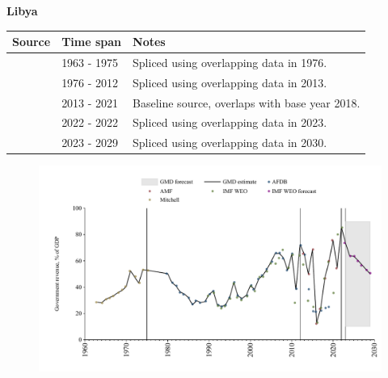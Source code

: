 \documentclass[12pt,a4paper,landscape]{article}
\begin{document}
\begin{adjustbox}{max totalsize={\paperwidth}{\paperheight},center}
\begin{minipage}[t][\textheight][t]{\textwidth}
\vspace*{0.5cm}
{}
\begin{center}
{\Large\bfseries Libya}
\end{center}
\vspace{0.5cm}
\begin{table}[H]
\centering
\small
\begin{tabular}{|l|l|l|}
\hline
\textbf{Source} & \textbf{Time span} & \textbf{Notes} \\
\hline
\rowcolor{white}\cite{Mitchell}& 1963 - 1975 &Spliced using overlapping data in 1976.\\
\rowcolor{lightgray}\cite{AFDB}& 1976 - 2012 &Spliced using overlapping data in 2013.\\
\rowcolor{white}\cite{AMF}& 2013 - 2021 &Baseline source, overlaps with base year 2018.\\
\rowcolor{lightgray}\cite{IMF_WEO}& 2022 - 2022 &Spliced using overlapping data in 2023.\\
\rowcolor{white}\cite{IMF_WEO_forecast}& 2023 - 2029 &Spliced using overlapping data in 2030.\\
\hline
\end{tabular}
\end{table}
\begin{figure}[H]
\centering
\includegraphics[width=\textwidth,height=0.6\textheight,keepaspectratio]{graphs/LBY_govrev_GDP.pdf}
\end{figure}
\end{minipage}
\end{adjustbox}
\end{document}
